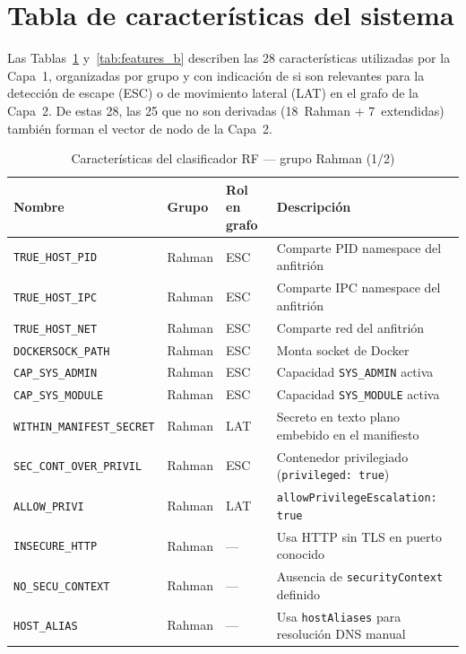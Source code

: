 \section{Tabla de características del sistema}
\label{sec:features_table}

Las Tablas~\ref{tab:features_a} y~\ref{tab:features_b} describen las 28 características
utilizadas por la Capa~1, organizadas por grupo y con indicación de si son relevantes
para la detección de escape (ESC) o de movimiento lateral (LAT) en el grafo
de la Capa~2. De estas 28, las 25 que no son derivadas (18~Rahman + 7~extendidas)
también forman el vector de nodo de la Capa~2.

\begin{table}[htbp]
\centering\small
\caption{Características del clasificador \ac{RF} — grupo Rahman (1/2)}
\label{tab:features_a}
\begin{tabular}{@{}p{4.2cm}llp{4.5cm}@{}}
\toprule
Nombre & Grupo & Rol en grafo & Descripción \\
\midrule
\texttt{TRUE\_HOST\_PID} & Rahman & ESC & Comparte PID namespace del anfitrión \\
\texttt{TRUE\_HOST\_IPC} & Rahman & ESC & Comparte IPC namespace del anfitrión \\
\texttt{TRUE\_HOST\_NET} & Rahman & ESC & Comparte red del anfitrión \\
\texttt{DOCKERSOCK\_PATH} & Rahman & ESC & Monta socket de Docker \\
\texttt{CAP\_SYS\_ADMIN} & Rahman & ESC & Capacidad \texttt{SYS\_ADMIN} activa \\
\texttt{CAP\_SYS\_MODULE} & Rahman & ESC & Capacidad \texttt{SYS\_MODULE} activa \\
\texttt{WITHIN\_MANIFEST\_SECRET} & Rahman & LAT & Secreto en texto plano embebido en el manifiesto \\
\texttt{SEC\_CONT\_OVER\_PRIVIL} & Rahman & ESC & Contenedor privilegiado (\texttt{privileged: true}) \\
\texttt{ALLOW\_PRIVI} & Rahman & LAT & \texttt{allowPrivilegeEscalation: true} \\
\texttt{INSECURE\_HTTP} & Rahman & — & Usa HTTP sin TLS en puerto conocido \\
\texttt{NO\_SECU\_CONTEXT} & Rahman & — & Ausencia de \texttt{securityContext} definido \\
\texttt{HOST\_ALIAS} & Rahman & — & Usa \texttt{hostAliases} para resolución DNS manual \\

\end{tabular}
\end{table}
